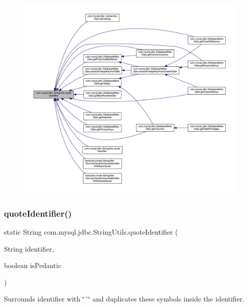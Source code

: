 \begin{figure}[H]
\begin{center}
\leavevmode
\includegraphics[width=350pt]{classcom_1_1mysql_1_1jdbc_1_1_string_utils_ad75792b3351810790b35be02d6481bec_icgraph}
\end{center}
\end{figure}
\mbox{\label{classcom_1_1mysql_1_1jdbc_1_1_string_utils_a7ecf14188b41e974d586d79f3295d4f1}} 
\subsubsection{\texorpdfstring{quote\+Identifier()}{quoteIdentifier()}\hspace{0.1cm}{\footnotesize\ttfamily [2/2]}}
{\footnotesize\ttfamily static String com.\+mysql.\+jdbc.\+String\+Utils.\+quote\+Identifier (\begin{DoxyParamCaption}\item[{String}]{identifier,  }\item[{boolean}]{is\+Pedantic }\end{DoxyParamCaption})\hspace{0.3cm}{\ttfamily [static]}}

Surrounds identifier with \char`\"{}\`{}\char`\"{} and duplicates these symbols inside the identifier.


